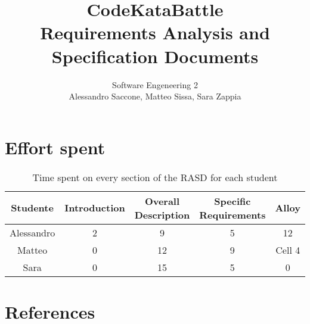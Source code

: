 \documentclass[12pt,a4paper]{article}
\title{CodeKataBattle\\ Requirements Analysis and Specification Documents}
\author{Software Engeneering 2\\
       Alessandro Saccone, Matteo Sissa, Sara Zappia}
\begin{document}
\maketitle

\newpage
\tableofcontents









\section{Effort spent}
\begin{table}[h]
  \centering
  \begin{tabular}{|c|c|c|c|c|}
    \hline
     Studente & Introduction & Overall Description & Specific Requirements & Alloy \\
    \hline
    Alessandro & 2 & 9 & 5 & 12 \\
    \hline
    Matteo & 0 & 12 & 9 & Cell 4 \\
    \hline
    Sara & 0 & 15 & 5 & 0 \\
    \hline
  \end{tabular}
  \caption{Time spent on every section of the RASD for each student}
  \label{tab:effort}
\end{table}

\section{References}
%
%
\end{document}
